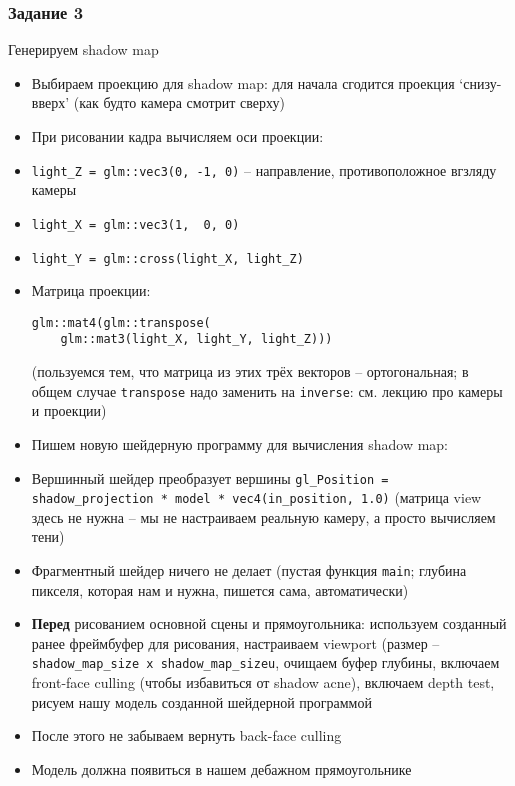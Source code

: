 \documentclass{beamer}
\begin{document}
\begin{frame}[fragile]
\frametitle{Задание 3}
\begin{tiny}
Генерируем shadow map
\begin{itemize}
\item Выбираем проекцию для shadow map: для начала сгодится проекция `снизу-вверх' (как будто камера смотрит сверху)
\item При рисовании кадра вычисляем оси проекции:
\item \verb|light_Z = glm::vec3(0, -1, 0)| -- направление, противоположное вгзляду камеры
\item \verb|light_X = glm::vec3(1,  0, 0)|
\item \verb|light_Y = glm::cross(light_X, light_Z)|
\item Матрица проекции: \begin{verbatim}glm::mat4(glm::transpose(
    glm::mat3(light_X, light_Y, light_Z)))\end{verbatim} (пользуемся тем, что матрица из этих трёх векторов -- ортогональная; в общем случае \verb|transpose| надо заменить на \verb|inverse|: см. лекцию про камеры и проекции)
\item Пишем новую шейдерную программу для вычисления shadow map:
\item Вершинный шейдер преобразует вершины \verb|gl_Position = shadow_projection * model * vec4(in_position, 1.0)| (матрица view здесь не нужна -- мы не настраиваем реальную камеру, а просто вычисляем тени)
\item Фрагментный шейдер ничего не делает (пустая функция \verb|main|; глубина пикселя, которая нам и нужна, пишется сама, автоматически)
\item \textbf{Перед} рисованием основной сцены и прямоугольника: используем созданный ранее фреймбуфер для рисования, настраиваем viewport (размер -- \verb|shadow_map_size x shadow_map_sizeu|, очищаем буфер глубины, включаем front-face culling (чтобы избавиться от shadow acne), включаем depth test, рисуем нашу модель созданной шейдерной программой
\item После этого не забываем вернуть back-face culling
\item Модель должна появиться в нашем дебажном прямоугольнике
\end{itemize}
\end{tiny}
\end{frame}
\end{document}
